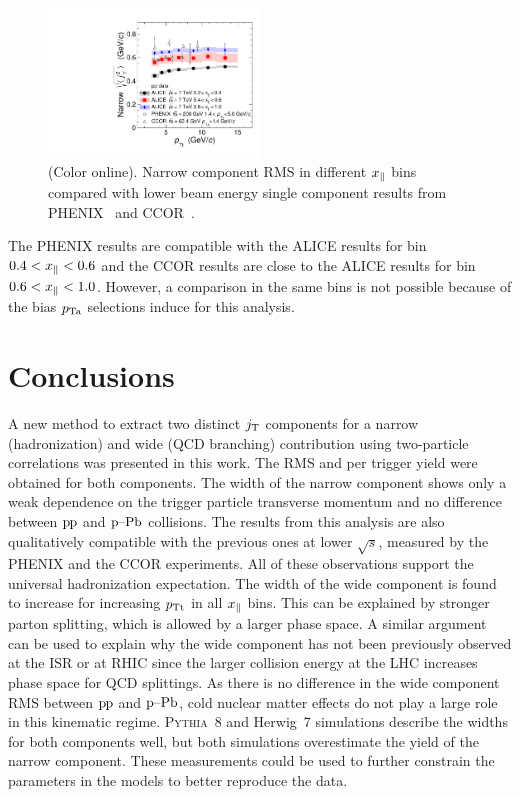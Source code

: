   \begin{figure}[t]
    \begin{center}
      \includegraphics[width = 0.5\textwidth]{figures/results/jtPhenixCcorCompare}
    \end{center}
    \caption{(Color online). Narrow component RMS in different $x_{\parallel}$ bins compared with lower beam energy single component results from PHENIX~\cite{PHENIXjets} and CCOR~\cite{firstjtmeasurement}.}
    \label{fig:ancientCompare}
  \end{figure}

The PHENIX results are compatible with the ALICE results for bin $0.4 < x_{\parallel} < 0.6$ and the CCOR results are close to the ALICE results for bin $0.6 < x_{\parallel} < 1.0$. However, a comparison in the same bins is not possible because of the bias $p_{\rm Ta}$ selections induce for this analysis.

\section{Conclusions}
\label{sec:conclusions}

A new method to extract two distinct $j_{\rm T}$ components for  a narrow (hadronization) and wide (QCD branching) contribution using two-particle correlations was presented in this work.  The RMS and per trigger yield were obtained for both components. The width of the narrow component shows only a weak dependence on the trigger particle transverse momentum and no difference between $\mbox{p\kern-0.05em p}$ and $\mbox{p--Pb}$ collisions. The results from this analysis are also qualitatively compatible with the previous ones at lower $\sqrt{s}$, measured by the PHENIX and the CCOR experiments. All of these observations support the universal hadronization expectation. The width of the wide component is found to increase for increasing $p_{\rm Tt}$ in all $x_{\parallel}$ bins. This can be explained by stronger parton splitting, which is allowed by a larger phase space. A similar argument can be used to explain why the wide component has not been previously observed at the ISR or at RHIC since the larger collision energy at the LHC increases phase space for QCD splittings. As there is no difference in the wide component RMS between $\mbox{p\kern-0.05em p}$ and $\mbox{p--Pb}$, cold nuclear matter effects do not play a large role in this kinematic regime. \textsc{Pythia}~8 and Herwig~7 simulations describe the widths for both components well, but both simulations overestimate the yield of the narrow component. These measurements could be used to further constrain the parameters in the models to better reproduce the data.

